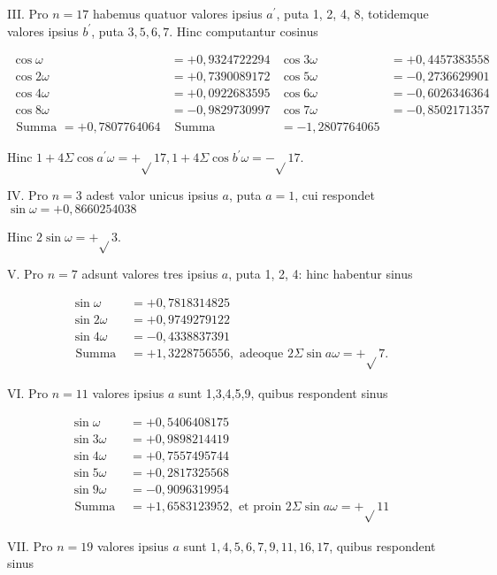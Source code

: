 \documentclass[10pt]{article}
\begin{document}
III. Pro \(n=17\) habemus quatuor valores ipsius \(a^{\prime}\), puta 1, 2, 4, 8, totidemque valores ipsius \(b^{\prime}\), puta \(3,5,6,7\). Hinc computantur cosinus

\[
\begin{array}{rlrl}
\cos \omega & =+0,9324722294 & \cos 3 \omega & =+0,4457383558 \\
\cos 2 \omega & =+0,7390089172 & \cos 5 \omega & =-0,2736629901 \\
\cos 4 \omega & =+0,0922683595 & \cos 6 \omega & =-0,6026346364 \\
\cos 8 \omega & =-0,9829730997 & \cos 7 \omega & =-0,8502171357 \\
\hline \text { Summa }=+0,7807764064 & \text { Summa } & =-1,2807764065
\end{array}
\]

Hinc \(1+4 \Sigma \cos a^{\prime} \omega=+\sqrt{ } 17,1+4 \Sigma \cos b^{\prime} \omega=-\sqrt{ } 17\).

IV. Pro \(n=3\) adest valor unicus ipsius \(a\), puta \(a=1\), cui respondet \(\sin \omega=+0,8660254038\)

Hinc \(2 \sin \omega=+\sqrt{ } 3\).

V. Pro \(n=7\) adsunt valores tres ipsius \(a\), puta 1, 2, 4: hinc habentur sinus

\[
\begin{aligned}
\sin \omega & =+0,7818314825 \\
\sin 2 \omega & =+0,9749279122 \\
\sin 4 \omega & =-0,4338837391 \\
\hline \text { Summa } & =+1,3228756556, \text { adeoque } 2 \Sigma \sin a \omega=+\sqrt{ } 7 .
\end{aligned}
\]

VI. Pro \(n=11\) valores ipsius \(a\) sunt 1,3,4,5,9, quibus respondent sinus

\[
\begin{aligned}
\sin \omega & =+0,5406408175 \\
\sin 3 \omega & =+0,9898214419 \\
\sin 4 \omega & =+0,7557495744 \\
\sin 5 \omega & =+0,2817325568 \\
\sin 9 \omega & =-0,9096319954 \\
\text { Summa } & =+1,6583123952, \text { et proin } 2 \Sigma \sin a \omega=+\sqrt{ } 11
\end{aligned}
\]

VII. Pro \(n=19\) valores ipsius \(a\) sunt \(1,4,5,6,7,9,11,16,17\), quibus respondent sinus
\end{document}
